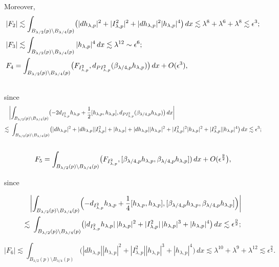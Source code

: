 \documentclass[11pt]{article}
\numberwithin{equation}{section} \setlength{\topmargin}{-35pt}
\begin{document}
\noindent Moreover,
\begin{align}
\notag &|F_2 |\lesssim \int_{B_{\lambda/2}(p)\setminus
B_{\lambda/4}(p)}\bigl(|dh_{\lambda,p}|^2 + |I^2_{\lambda,p}|^2
+|dh_{\lambda,p}|^2 |h_{\lambda,p}|^4\bigr)\,dx
\lesssim\lambda^8+\lambda^6+\lambda^{8}\lesssim\epsilon^3;\notag\\
&|F_3 |\lesssim \int_{B_{\lambda/2}(p)\setminus B_{\lambda/4}(p)}
|h_{\lambda,p}|^4\,dx\lesssim \lambda^{12}\sim\epsilon^6;\notag\\
&F_4 = \int_{B_{\lambda/2}(p)\setminus B_{\lambda/4}(p)}\bigl(F_{
I^2_{\lambda,p}}, d_{
PI^2_{\lambda,p}} (\beta_{\lambda/4,p} h_{\lambda,p})\bigr)\,dx+ O(\epsilon^3),\notag\\
\notag
\end{align}
\noindent since
\begin{align}
&\notag \biggl|\int_{B_{\lambda/2}(p)\setminus
B_{\lambda/4}(p)}\bigl(- 2d_{I^2_{\lambda,p}}h_{\lambda,p} + \frac
{1}{2} [h_{\lambda,p}, h_{\lambda,p}], d_{PI^2_{\lambda,p}}
(\beta_{\lambda/4,p}h_{\lambda,p})\bigr)\,dx\biggr|\notag\\
\lesssim&~\int_{B_{\lambda/2}(p)\setminus B_{\lambda/4}(p)}\bigl(
|dh_{\lambda,p}|^2 + |dh_{\lambda,p}||I^2_{\lambda,p}|
+|h_{\lambda,p}| + |dh_{\lambda,p}| |h_{\lambda,p}|^2 +
|I^2_{\lambda,p}|^2 |h_{\lambda,p}|^2 +
|I^2_{\lambda,p}||h_{\lambda,p}|^4\bigr)\,dx \lesssim
\epsilon^3;\notag\\
\notag
\end{align}
\begin{equation}
\notag F_5= \int_{B_{\lambda/2}(p)\setminus B_{\lambda/4}(p)}
\bigl(F_{I^2_{\lambda,p}},
[\beta_{\lambda/4,p}h_{\lambda,p},\beta_{\lambda/4,p}h_{\lambda,p}])\,dx
+ O(\epsilon^\frac {9}{2}\bigr),
\end{equation}

\noindent since

\begin{align*}
&\biggl|\int_{B_{\lambda/2}(p)\setminus B_{\lambda/4}(p)} \Bigl(-
d_{I^2_{\lambda,p}}h_{\lambda,p} + \frac {1}{4} [h_{\lambda,p},
h_{\lambda,p}],
[\beta_{\lambda/4,p}h_{\lambda,p},\beta_{\lambda/4,p}h_{\lambda,p}]\Big) \biggr|\\
\lesssim&~\int_{B_{\lambda/2}(p)\setminus B_{\lambda/4}(p)}
\bigl(|d_{I^2_{\lambda,p}}h_{\lambda,p}|\,|h_{\lambda,p}|^2 +
|I^2_{\lambda,p}|\,|h_{\lambda,p}|^3 + |h_{\lambda,p}|^4\bigr)\,dx
\lesssim \epsilon^\frac {9}{2};
\end{align*}

$$ |F_6 |\lesssim\int_{B_{\lambda/2}(p)\setminus
B_{\lambda/4}(p)} \bigl(|dh_{\lambda,p}||h_{\lambda,p}|^2 +
|I^2_{\lambda,p}||h_{\lambda,p}|^3 + |h_{\lambda,p}|^4\bigr)\,dx
\lesssim
\lambda^{10}+\lambda^9+\lambda^{12}\lesssim\epsilon^{\frac{9}{2}}.
$$
\end{document}
